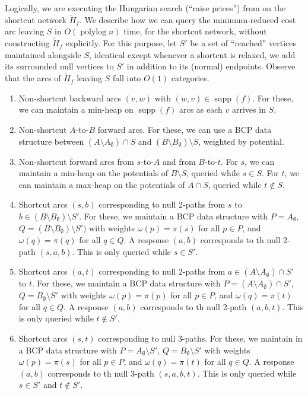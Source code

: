 \documentclass[11pt]{article}
\def\polylog{\mathop{\mathrm{polylog}}}
\def\supp{\operatorname{supp}}
\theoremstyle{plain}
\numberwithin{figure}{section}
\begin{document}
Logically, we are executing the Hungarian search (``raise prices'') from
\cite[Section 3.2]{GHKT17} on the shortcut network $\tilde{H}_f$.
We describe how we can query the minimum-reduced cost arc leaving $S$ in
$O(\polylog n)$ time, for the shortcut network, without constructing
$\tilde{H}_f$ explicitly.
For this purpose, let $S'$ be a set of ``reached'' vertices maintained
alongside $S$, identical except whenever a shortcut is relaxed, we add its
surrounded null vertices to $S'$ in addition to its (normal) endpoints.
Observe that the arcs of $\tilde{H}_f$ leaving $S$ fall into $O(1)$ categories.
\begin{enumerate}
\item Non-shortcut backward arcs $(v, w)$ with $(w, v) \in \supp(f)$.
	For these, we can maintain a min-heap on $\supp(f)$ arcs as each $v$
	arrives in $S$.
\item Non-shortcut $A$-to-$B$ forward arcs.
	For these, we can use a BCP data structure between
	$(A \setminus A_\emptyset) \cap S$ and
	$(B \setminus B_\emptyset) \setminus S$, weighted by potential.
\item Non-shortcut forward arcs from $s$-to-$A$ and from $B$-to-$t$.
	For $s$, we can maintain a min-heap on the potentials of
	$B \setminus S$, queried while $s \in S$.
	For $t$, we can maintain a max-heap on the potentials of
	$A \cap S$, queried while $t \not\in S$.

\item Shortcut arcs $(s, b)$ corresponding to null 2-paths from $s$ to
	$b \in (B \setminus B_\emptyset) \setminus S'$.
	For these, we maintain a BCP data structure with $P = A_\emptyset$,
	$Q = (B \setminus B_\emptyset) \setminus S')$ with weights
	$\omega(p) = \pi(s)$ for all $p \in P$, and $\omega(q) = \pi(q)$ for
	all $q \in Q$.
	A response $(a, b)$ corresponds to th null 2-path $(s, a, b)$.
	This is only queried while $s \in S'$.
\item Shortcut arcs $(a, t)$ corresponding to null 2-paths from
	$a \in (A \setminus A_\emptyset) \cap S'$ to $t$.
	For these, we maintain a BCP data structure with
	$P = (A \setminus A_\emptyset) \cap S'$,
	$Q = B_\emptyset \setminus S'$ with weights $\omega(p) = \pi(p)$ for
	all $p \in P$, and $\omega(q) = \pi(t)$ for all $q \in Q$.
	A response $(a, b)$ corresponds to th null 2-path $(a, b, t)$.
	This is only queried while $t \not\in S'$.
\item Shortcut arcs $(s, t)$ corresponding to null 3-paths.
	For these, we maintain in a BCP data structure with
	$P = A_\emptyset \setminus S'$, $Q = B_\emptyset \setminus S'$ with
	weights $\omega(p) = \pi(s)$ for all
	$p \in P$, and $\omega(q) = \pi(t)$ for all $q \in Q$.
	A response $(a, b)$ corresponds to th null 3-path $(s, a, b, t)$.
	This is only queried while $s \in S'$ and $t \not\in S'$.
\end{enumerate}
\end{document}
